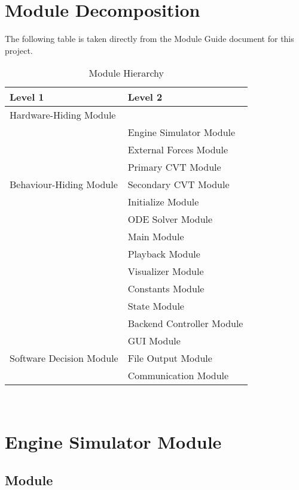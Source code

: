 \documentclass[12pt, titlepage]{article}
\begin{document}
\section{Module Decomposition}

The following table is taken directly from the Module Guide document for this project.

\begin{table}[h!]
\centering
\begin{tabular}{p{} p{}}
\toprule
\textbf{Level 1} & \textbf{Level 2}\\
\midrule

{Hardware-Hiding Module} & ~ \\
\midrule

\multirow{7}{0.3\textwidth}{Behaviour-Hiding Module}
& Engine Simulator Module\\
& External Forces Module\\
& Primary CVT Module\\
& Secondary CVT Module\\
& Initialize Module\\
& ODE Solver Module\\
& Main Module\\ 
& Playback Module\\
& Visualizer Module\\
& Constants Module\\
& State Module\\
& Backend Controller Module\\
\midrule

\multirow{3}{0.3\textwidth}{Software Decision Module}
& GUI Module\\
& File Output Module\\
& Communication Module\\
\bottomrule

\end{tabular}
\caption{Module Hierarchy}
\label{TblMH}
\end{table}

\newpage
~\newpage

\section{Engine Simulator Module} \label{Module_engine_simulator}

\subsection{Module}
\end{document}
